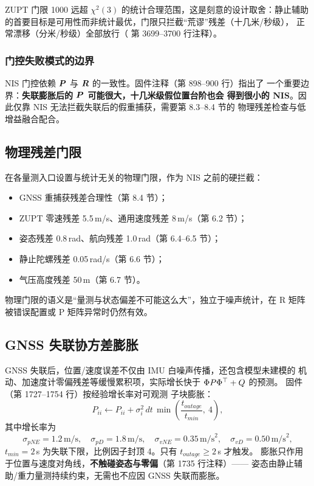 \begin{remark}
ZUPT 门限 1000 远超 $\chi^2(3)$ 的统计合理范围，这是刻意的设计取舍：静止辅助
的首要目标是可用性而非统计最优，门限只拦截``荒谬''残差（十几米/秒级），
正常漂移（分米/秒级）全部放行（ 第 3699--3700 行注释）。
\end{remark}

\subsubsection{门控失败模式的边界}

NIS 门控依赖 $\boldsymbol{P}$ 与 $\boldsymbol{R}$ 的一致性。固件注释（第 898--900 行）指出了
一个重要边界：\textbf{失联膨胀后的 $\boldsymbol{P}$ 可能很大，十几米级假位置台阶也会
得到很小的 NIS}。因此仅靠 NIS 无法拦截失联后的假重捕获，需要第 8.3--8.4 节的
物理残差检查与低增益融合配合。

\subsection{物理残差门限}

在各量测入口设置与统计无关的物理门限，作为 NIS 之前的硬拦截：
\begin{itemize}
  \item GNSS 重捕获残差合理性（第 8.4 节）；
  \item ZUPT 零速残差 5.5\,m/s、通用速度残差 8\,m/s（第 6.2 节）；
  \item 姿态残差 0.8\,rad、航向残差 1.0\,rad（第 6.4--6.5 节）；
  \item 静止陀螺残差 0.05\,rad/s（第 6.6 节）；
  \item 气压高度残差 50\,m（第 6.7 节）。
\end{itemize}
物理门限的语义是``量测与状态偏差不可能这么大''，独立于噪声统计，在 R 矩阵
被错误配置或 P 矩阵异常时仍然有效。

\subsection{GNSS 失联协方差膨胀}

GNSS 失联后，位置/速度误差不仅由 IMU 白噪声传播，还包含模型未建模的
机动、加速度计零偏残差等缓慢累积项，实际增长快于 $\Phi P\Phi^{\top} + Q$ 的预测。
固件 （第 1727--1754 行）按经验增长率对可观测
子块膨胀：
\begin{equation}
  P_{ii} \leftarrow P_{ii} + \sigma_i^2\,dt\,\min\left(
    \frac{t_{outage}}{t_{min}},\ 4\right),
  \label{eq:outage-growth}
\end{equation}
其中增长率为
\begin{equation}
  \sigma_{pNE} = 1.2\,\text{m/s},\quad
  \sigma_{pD} = 1.8\,\text{m/s},\quad
  \sigma_{vNE} = 0.35\,\text{m/s}^2,\quad
  \sigma_{vD} = 0.50\,\text{m/s}^2,
  \label{eq:outage-rates}
\end{equation}
$t_{min} = 2$\,s 为失联下限，比例因子封顶 4。只有 $t_{outage} \ge 2$\,s 才触发。
膨胀只作用于位置与速度对角线，\textbf{不触碰姿态与零偏}（第 1735 行注释）——
姿态由静止辅助/重力量测持续约束，无需也不应因 GNSS 失联而膨胀。

